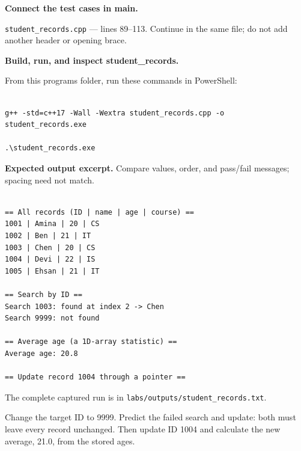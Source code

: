 


\tcbbreak

\begin{utpsteps}\setcounter{enumi}{3}\item \textbf{Connect the test cases in main.}\end{utpsteps}

\texttt{student\_records.cpp} --- lines 89--113. Continue in the same file; do not add another header or opening brace.




\tcbbreak

\textbf{Build, run, and inspect student\_records.}

From this program\textquotesingle s folder, run these commands in PowerShell:

\begin{lstlisting}[style=utpterminal,language={}]

g++ -std=c++17 -Wall -Wextra student_records.cpp -o student_records.exe

.\student_records.exe

\end{lstlisting}

\textbf{Expected output excerpt.} Compare values, order, and pass/fail messages; spacing need not match.

\begin{lstlisting}[style=utpterminal,language={}]

== All records (ID | name | age | course) ==
1001 | Amina | 20 | CS
1002 | Ben | 21 | IT
1003 | Chen | 20 | CS
1004 | Devi | 22 | IS
1005 | Ehsan | 21 | IT

== Search by ID ==
Search 1003: found at index 2 -> Chen
Search 9999: not found

== Average age (a 1D-array statistic) ==
Average age: 20.8

== Update record 1004 through a pointer ==

\end{lstlisting}

The complete captured run is in \texttt{labs/outputs/student\_records.txt}.

\begin{tryit}

Change the target ID to 9999. Predict the failed search and update: both must leave every record unchanged. Then update ID 1004 and calculate the new average, 21.0, from the stored ages.

\end{tryit}
